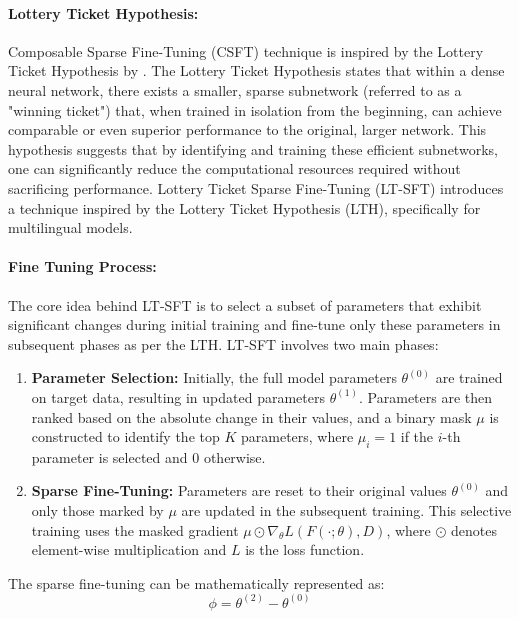 \paragraph{Lottery Ticket Hypothesis:} Composable Sparse Fine-Tuning (CSFT) technique is inspired by the Lottery Ticket Hypothesis by \citet{frankle2019lottery}. The Lottery Ticket Hypothesis states that within a dense neural network, there exists a smaller, sparse subnetwork (referred to as a "winning ticket") that, when trained in isolation from the beginning, can achieve comparable or even superior performance to the original, larger network. This hypothesis suggests that by identifying and training these efficient subnetworks, one can significantly reduce the computational resources required without sacrificing performance. Lottery Ticket Sparse Fine-Tuning (LT-SFT) introduces a technique inspired by the Lottery Ticket Hypothesis (LTH), specifically for multilingual models.

\paragraph{Fine Tuning Process:} The core idea behind LT-SFT is to select a subset of parameters that exhibit significant changes during initial training and fine-tune only these parameters in subsequent phases as per the LTH. LT-SFT involves two main phases:
\begin{enumerate}
	\item \textbf{Parameter Selection:} Initially, the full model parameters $\theta^{(0)}$ are trained on target data, resulting in updated parameters $\theta^{(1)}$. Parameters are then ranked based on the absolute change in their values, and a binary mask $\mu$ is constructed to identify the top $K$ parameters, where $\mu_i = 1$ if the $i$-th parameter is selected and $0$ otherwise.
	
	\item \textbf{Sparse Fine-Tuning:} Parameters are reset to their original values $\theta^{(0)}$ and only those marked by $\mu$ are updated in the subsequent training. This selective training uses the masked gradient $\mu \odot \nabla_{\theta} L(F(\cdot;\theta), D)$, where $\odot$ denotes element-wise multiplication and $L$ is the loss function.
\end{enumerate}

The sparse fine-tuning can be mathematically represented as:
\begin{equation}
	\phi = \theta^{(2)} - \theta^{(0)}
\end{equation}


